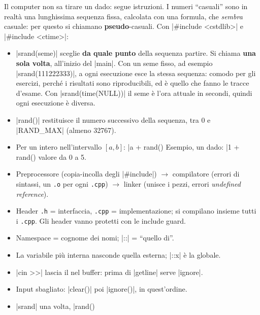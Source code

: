Il computer non sa tirare un dado: segue istruzioni. I numeri ``casuali'' sono
in realtà una lunghissima sequenza fissa, calcolata con una formula, che
\emph{sembra} casuale: per questo si chiamano \textbf{pseudo}-casuali.
Con \cc|#include <cstdlib>| e \cc|#include <ctime>|:
\begin{itemize}
  \item \cc|srand(seme)| sceglie \textbf{da quale punto} della sequenza
        partire. Si chiama \textbf{una sola volta}, all'inizio del \cc|main|.
        Con un seme fisso, ad esempio \cc|srand(111222333)|, a ogni esecuzione
        esce la stessa sequenza: comodo per gli esercizi, perché i risultati sono
        riproducibili, ed è quello che fanno le tracce d'esame. Con
        \cc|srand(time(NULL))| il seme è l'ora attuale in secondi, quindi ogni
        esecuzione è diversa.
  \item \cc|rand()| restituisce il numero successivo della sequenza, tra 0 e
        \cc|RAND_MAX| (almeno 32767).
  \item Per un intero nell'intervallo $[a, b]$: \cc|a + rand() %
        Esempio, un dado: \cc|1 + rand() %
        valore da 0 a 5.
\end{itemize}

\begin{inparole}
\begin{itemize}
  \item Preprocessore (copia-incolla degli \cc|#include|) $\to$ compilatore
        (errori di sintassi, un \texttt{.o} per ogni \texttt{.cpp}) $\to$ linker
        (unisce i pezzi, errori \emph{undefined reference}).
  \item Header \texttt{.h} = interfaccia, \texttt{.cpp} = implementazione;
        si compilano insieme tutti i \texttt{.cpp}. Gli header vanno protetti con
        le include guard.
  \item Namespace = cognome dei nomi; \cc|::| = ``quello di''.
  \item La variabile più interna nasconde quella esterna; \cc|::x| è la globale.
  \item \cc|cin >>| lascia il \nl{} nel buffer: prima di \cc|getline| serve \cc|ignore|.
  \item Input sbagliato: \cc|clear()| poi \cc|ignore()|, in quest'ordine.
  \item \cc|srand| una volta, \cc|rand() %
\end{itemize}
\end{inparole}

